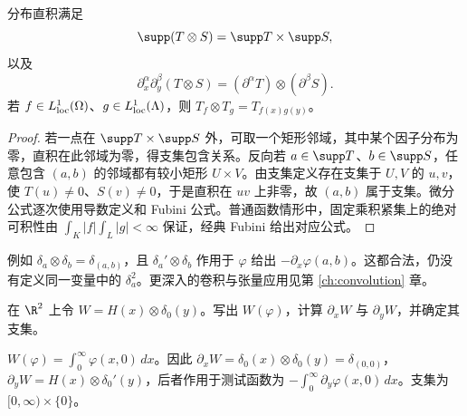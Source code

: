 \begin{proposition}[补充：支集、微分与普通函数的对应]
分布直积满足
\[
 \supp(T\otimes S)=\supp T\times\supp S,
\]
以及
\[
 \partial_x^\alpha\partial_y^\beta(T\otimes S)
 =(\partial^\alpha T)\otimes(\partial^\beta S).
\]
若 $f\in L^1_{\mathrm{loc}}(\Omega)$、$g\in L^1_{\mathrm{loc}}(\Lambda)$，则 $T_f\otimes T_g=T_{f(x)g(y)}$。
\end{proposition}
\begin{proof}
若一点在 $\supp T\times\supp S$ 外，可取一个矩形邻域，其中某个因子分布为零，直积在此邻域为零，得支集包含关系。反向若 $a\in\supp T$、$b\in\supp S$，任意包含 $(a,b)$ 的邻域都有较小矩形 $U\times V$。由支集定义存在支集于 $U,V$ 的 $u,v$，使 $T(u)\ne0$、$S(v)\ne0$，于是直积在 $uv$ 上非零，故 $(a,b)$ 属于支集。微分公式逐次使用导数定义和 Fubini 公式。普通函数情形中，固定乘积紧集上的绝对可积性由 $\int_K|f|\int_L|g|<\infty$ 保证，经典 Fubini 给出对应公式。
\end{proof}
例如 $\delta_a\otimes\delta_b=\delta_{(a,b)}$，且 $\delta_a'\otimes\delta_b$ 作用于 $\varphi$ 给出 $-\partial_x\varphi(a,b)$。这都合法，仍没有定义同一变量中的 $\delta_a^2$。更深入的卷积与张量应用见第 \ref{ch:convolution} 章。

\begin{exercise}[补充：直积与微分的检验]
在 $\R^2$ 上令 $W=H(x)\otimes\delta_0(y)$。写出 $W(\varphi)$，计算 $\partial_xW$ 与 $\partial_yW$，并确定其支集。
\end{exercise}
\begin{solution}
$W(\varphi)=\int_0^\infty\varphi(x,0)\,dx$。因此 $\partial_xW=\delta_0(x)\otimes\delta_0(y)=\delta_{(0,0)}$，$\partial_yW=H(x)\otimes\delta_0'(y)$，后者作用于测试函数为 $-\int_0^\infty\partial_y\varphi(x,0)\,dx$。支集为 $[0,\infty)\times\{0\}$。
\end{solution}

